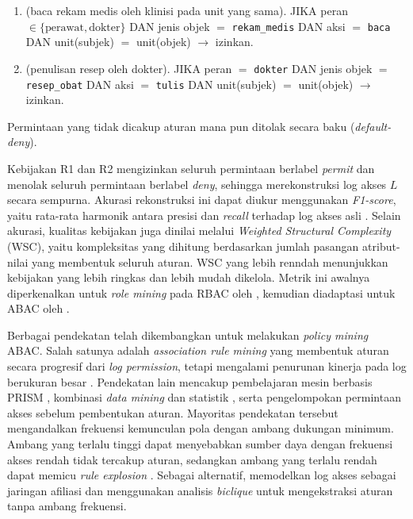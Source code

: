 \begin{enumerate}[label=\textbf{R\arabic*.}, leftmargin=*]
    \item (baca rekam medis oleh klinisi pada unit yang sama).
    JIKA peran $\in \{\text{perawat}, \text{dokter}\}$ DAN jenis objek $=$ \texttt{rekam\_medis} DAN aksi $=$ \texttt{baca} DAN unit(subjek) $=$ unit(objek) $\rightarrow$ izinkan.

    \item (penulisan resep oleh dokter).
    JIKA peran $=$ \texttt{dokter} DAN jenis objek $=$ \texttt{resep\_obat} DAN aksi $=$ \texttt{tulis} DAN unit(subjek) $=$ unit(objek) $\rightarrow$ izinkan.
\end{enumerate}

Permintaan yang tidak dicakup aturan mana pun ditolak secara baku (\textit{default-deny}).

Kebijakan R1 dan R2 mengizinkan seluruh permintaan berlabel \textit{permit} dan menolak seluruh permintaan berlabel \textit{deny}, sehingga merekonstruksi log akses $L$ secara sempurna.
Akurasi rekonstruksi ini dapat diukur menggunakan \textit{F1-score}, yaitu rata-rata harmonik antara presisi dan \textit{recall} terhadap log akses asli \parencite{diaz-rodriguez_abac_2025}.
Selain akurasi, kualitas kebijakan juga dinilai melalui \textit{Weighted Structural Complexity} (WSC), yaitu kompleksitas yang dihitung berdasarkan jumlah pasangan atribut-nilai yang membentuk seluruh aturan.
WSC yang lebih renndah menunjukkan kebijakan yang lebih ringkas dan lebih mudah dikelola.
Metrik ini awalnya diperkenalkan untuk \textit{role mining} pada RBAC oleh \textcite{molloy_critical_1995}, kemudian diadaptasi untuk ABAC oleh \textcite{xu_mining_2015} \parencite{perez-haro_abac_2024}.

Berbagai pendekatan telah dikembangkan untuk melakukan \textit{policy mining} ABAC.
Salah satunya adalah \textit{association rule mining} yang membentuk aturan secara progresif dari \textit{log permission}, tetapi mengalami penurunan kinerja pada log berukuran besar \parencite{xu_mining_2015,diaz-rodriguez_abac_2025}.
Pendekatan lain mencakup pembelajaran mesin berbasis PRISM \parencite{iyer_mining_2018}, kombinasi \textit{data mining} dan statistik \parencite{chen_polisma_2020}, serta pengelompokan permintaan akses sebelum pembentukan aturan.
Mayoritas pendekatan tersebut mengandalkan frekuensi kemunculan pola dengan ambang dukungan minimum.
Ambang yang terlalu tinggi dapat menyebabkan sumber daya dengan frekuensi akses rendah tidak tercakup aturan, sedangkan ambang yang terlalu rendah dapat memicu \textit{rule explosion} \parencite{perez-haro_abac_2024}.
Sebagai alternatif, \textcite{perez-haro_abac_2024} memodelkan log akses sebagai jaringan afiliasi dan menggunakan analisis \textit{biclique} untuk mengekstraksi aturan tanpa ambang frekuensi.

